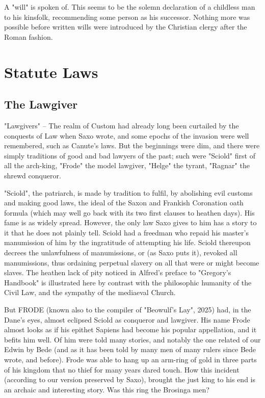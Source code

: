 \documentclass[10pt,a4paper]{report}
\begin{document}
A "will" is spoken of. This seems to be the solemn declaration of a childless man to his kinsfolk, recommending some person as his successor. Nothing more was possible before written wills were introduced by the Christian clergy after the Roman fashion.

\chapter{Statute Laws}
\section{The Lawgiver}
"Lawgivers" -- The realm of Custom had already long been curtailed by the conquests of Law when Saxo wrote, and some epochs of the invasion were well remembered, such as Canute's laws. But the beginnings were dim, and there were simply traditions of good and bad lawyers of the past; such were "Sciold" first of all the arch-king, "Frode" the model lawgiver, "Helge" the tyrant, "Ragnar" the shrewd conqueror.

"Sciold", the patriarch, is made by tradition to fulfil, by abolishing evil customs and making good laws, the ideal of the Saxon and Frankish Coronation oath formula (which may well go back with its two first clauses to heathen days). His fame is as widely spread. However, the only law Saxo gives to him has a story to it that he does not plainly tell. Sciold had a freedman who repaid his master's manumission of him by the ingratitude of attempting his life. Sciold thereupon decrees the unlawfulness of manumissions, or (as Saxo puts it), revoked all manumissions, thus ordaining perpetual slavery on all that were or might become slaves. The heathen lack of pity noticed in Alfred's preface to "Gregory's Handbook" is illustrated here by contrast with the philosophic humanity of the Civil Law, and the sympathy of the mediaeval Church.

But FRODE (known also to the compiler of "Beowulf's Lay", 2025) had, in the Dane's eyes, almost eclipsed Sciold as conqueror and lawgiver. His name Frode almost looks as if his epithet Sapiens had become his popular appellation, and it befits him well. Of him were told many stories, and notably the one related of our Edwin by Bede (and as it has been told by many men of many rulers since Bede wrote, and before). Frode was able to hang up an arm-ring of gold in three parts of his kingdom that no thief for many years dared touch. How this incident (according to our version preserved by Saxo), brought the just king to his end is an archaic and interesting story. Was this ring the Brosinga men?
\end{document}
